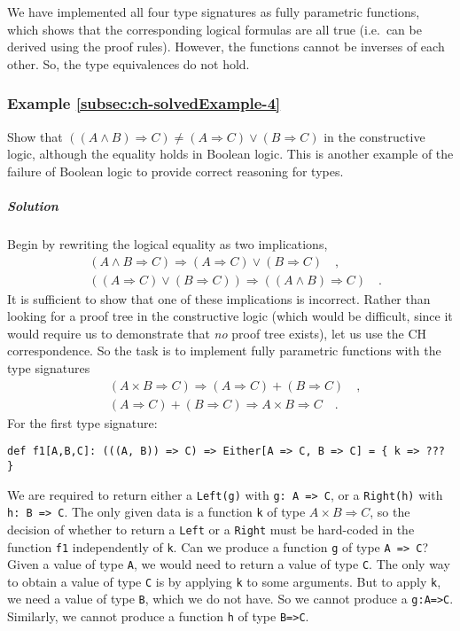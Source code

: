 We have implemented all four type signatures as fully parametric functions,
which shows that the corresponding logical formulas are all true (i.e.~can
be derived using the proof rules). However, the functions cannot be
inverses of each other. So, the type equivalences do not hold.

\subsubsection{Example \label{subsec:ch-solvedExample-4}\ref{subsec:ch-solvedExample-4}}

Show that $\left(\left(A\wedge B\right)\Rightarrow C\right)\neq(A\Rightarrow C)\vee(B\Rightarrow C)$
in the constructive logic, although the equality holds in Boolean
logic. This is another example of the failure of Boolean logic to
provide correct reasoning for types.

\subparagraph{Solution}

Begin by rewriting the logical equality as two implications,
\begin{align*}
 & (A\wedge B\Rightarrow C)\Rightarrow(A\Rightarrow C)\vee(B\Rightarrow C)\quad,\\
 & \left((A\Rightarrow C)\vee(B\Rightarrow C)\right)\Rightarrow\left(\left(A\wedge B\right)\Rightarrow C\right)\quad.
\end{align*}
It is sufficient to show that one of these implications is incorrect.
Rather than looking for a proof tree in the constructive logic (which
would be difficult, since it would require us to demonstrate that
\emph{no} proof tree exists), let us use the CH correspondence. So
the task is to implement fully parametric functions with the type
signatures
\begin{align*}
 & (A\times B\Rightarrow C)\Rightarrow(A\Rightarrow C)+(B\Rightarrow C)\quad,\\
 & (A\Rightarrow C)+(B\Rightarrow C)\Rightarrow A\times B\Rightarrow C\quad.
\end{align*}
 For the first type signature:
\begin{lstlisting}
def f1[A,B,C]: (((A, B)) => C) => Either[A => C, B => C] = { k => ??? }
\end{lstlisting}
We are required to return either a \lstinline!Left(g)! with \lstinline!g: A => C!,
or a \lstinline!Right(h)! with \lstinline!h: B => C!. The only given
data is a function \lstinline!k! of type $A\times B\Rightarrow C$,
so the decision of whether to return a \lstinline!Left! or a \lstinline!Right!
must be hard-coded in the function \lstinline!f1! independently of
\lstinline!k!. Can we produce a function \lstinline!g! of type \lstinline!A => C!?
Given a value of type \lstinline!A!, we would need to return a value
of type \lstinline!C!. The only way to obtain a value of type \lstinline!C!
is by applying \lstinline!k! to some arguments. But to apply \lstinline!k!,
we need a value of type \lstinline!B!, which we do not have. So we
cannot produce a \lstinline!g:A=>C!. Similarly, we cannot produce
a function \lstinline!h! of type \lstinline!B=>C!.

